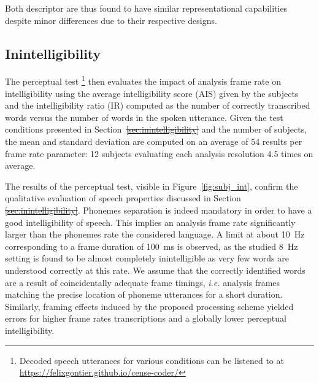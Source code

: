 \documentclass[sensors,article,submit,moreauthors,pdftex,10pt,a4paper]{mdpi}
\providecommand{\DIFaddtex}[1]{{\protect\color{blue}\uwave{#1}}} %
\providecommand{\DIFdeltex}[1]{{\protect\color{red}\sout{#1}}}                      %
\providecommand{\DIFaddbegin}{} %
\providecommand{\DIFaddend}{} %
\providecommand{\DIFdelbegin}{} %
\providecommand{\DIFdelend}{} %
\providecommand{\DIFadd}[1]{\texorpdfstring{\DIFaddtex{#1}}{#1}} %
\providecommand{\DIFdel}[1]{\texorpdfstring{\DIFdeltex{#1}}{}} %
\begin{document}
Both descriptor are thus found to have similar representational capabilities despite minor differences due to their respective designs.


\subsection{Inintelligibility} \DIFaddbegin \label{sec:inintelligibility_r}
\DIFaddend 

The perceptual test \footnote{Decoded speech utterances for various conditions can be listened to at \url{https://felixgontier.github.io/cense-coder/}} then evaluates the impact of analysis frame rate on intelligibility using the average intelligibility score (AIS) given by the subjects and the intelligibility ratio (IR) computed as the number of correctly transcribed words versus the number of words in the spoken utterance. Given the test conditions presented in Section~\DIFdelbegin \DIFdel{\ref{sec:inintelligibility} }\DIFdelend \DIFaddbegin \DIFadd{\ref{sec:inintelligibility_p} }\DIFaddend and the number of subjects, the mean and standard deviation are computed on an average of 54 results per frame rate parameter: 12 subjects evaluating each analysis resolution 4.5 times on average.

The results of the perceptual test, visible in Figure~\ref{fig:subj_int}, confirm the qualitative evaluation of speech properties discussed in Section \DIFdelbegin \DIFdel{\ref{sec:inintelligibility}}\DIFdelend \DIFaddbegin \DIFadd{\ref{sec:inintelligibility_p}}\DIFaddend . Phonemes separation is indeed mandatory in order to have a good intelligibility of speech. This implies an analysis frame rate significantly larger than the phonemes rate the considered language. A limit at about 10~Hz corresponding to a frame duration of 100~ms is observed, as the studied 8~Hz setting is found to be almost completely inintelligible as very few words are understood correctly at this rate. We assume that the correctly identified words are a result of coincidentally adequate frame timings, \textit{i.e.} analysis frames matching the precise location of phoneme utterances for a short duration. Similarly, framing effects induced by the proposed processing scheme yielded errors for higher frame rates transcriptions and a globally lower perceptual intelligibility.\\
\end{document}
